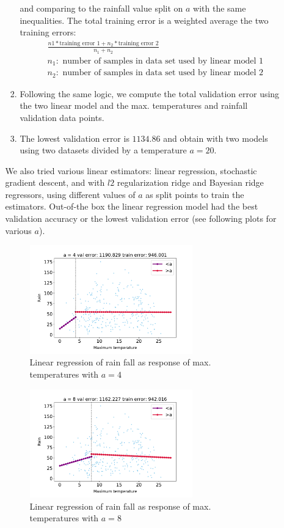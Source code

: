 \documentclass[12pt,twoside]{article}
\begin{document}
\begin{enumerate}
\begin{enumerate}
\begin{enumerate}[(1)]
		and comparing to the rainfall value split on $a$ with the same inequalities. 
		The total training error is a weighted average the two training errors: 
		\begin{align*}
			& \frac{n1 * \text{training error 1} + n_2  * \text{training error 2}} {n_1 + n_2} \\
			& n_1: \text{ number of samples in data set used by linear model 1} \\
			& n_2: \text{ number of samples in data set used by linear model 2}
		\end{align*}
		\item  Following the same logic, we compute the total validation error using the two linear model and the max. temperatures and rainfall validation data points.
		\item The lowest validation error is $1134.86$ and obtain with two models using two datasets divided by a temperature $a=20$.

	\end{enumerate}	
 	We also tried various linear estimators: linear regression, stochastic gradient descent, and with $l2$ regularization ridge and Bayesian ridge regressors, using different values of $a$ as split points to train the estimators.
	Out-of-the box the linear regression model had the best validation accuracy or the lowest validation error (see following plots for various $a$).
	
	\begin{figure}[H]
		\centering
		\includegraphics[width=200pt]{figures/a=4.pdf}
		\caption{Linear regression of rain fall as response of max. temperatures with $a=4$}
		\label{fig1}
	\end{figure}

	\begin{figure}[H]
		\centering
		\includegraphics[width=200pt]{figures/a=8.pdf}
		\caption{Linear regression of rain fall as response of max. temperatures with $a=8$}
		\label{fig2}
	\end{figure}


\end{enumerate}
\end{enumerate}
\end{document}
